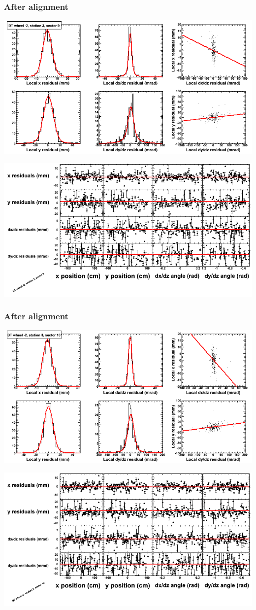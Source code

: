 \documentclass[compress]{beamer}
\begin{document}
\begin{frame}
\frametitle{After alignment}
\includegraphics[width=0.7\linewidth]{NOV4_fitfunctions/MBwhAst3sec09_bellcurves.png}

\includegraphics[width=0.7\linewidth]{NOV4_fitfunctions/MBwhAst3sec09_polynomials.png}
\end{frame}

\begin{frame}
\frametitle{After alignment}
\includegraphics[width=0.7\linewidth]{NOV4_fitfunctions/MBwhAst3sec10_bellcurves.png}

\includegraphics[width=0.7\linewidth]{NOV4_fitfunctions/MBwhAst3sec10_polynomials.png}
\end{frame}
\end{document}
